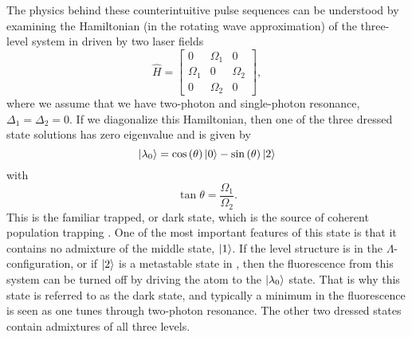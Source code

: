 The physics behind these counterintuitive pulse sequences can be understood
by examining the Hamiltonian (in the rotating wave approximation) of the
three-level system in
 driven by two laser fields
\begin{equation}
\hat{H} = \left[ 
\begin{array}{ccc}
0 & \Omega_1 & 0  \\
\Omega_1 & 0 & \Omega_2 \\
0 & \Omega_2 & 0
\end{array} \right],
\label{hamil}
\end{equation}
where we assume that we have two-photon and single-photon resonance, $\Delta_1
= \Delta_2 = 0$.  If we diagonalize this Hamiltonian, then one of the three
dressed state solutions has zero eigenvalue and is given by
\begin{equation}
\vert \lambda_0 \rangle = \cos\left(\theta\right)\vert 0 \rangle -
\sin\left(\theta\right)\vert 2 \rangle
\end{equation}
with
\begin{equation}
\tan\theta = \frac{\Omega_1}{\Omega_2}.
\end{equation}
This is the familiar trapped, or dark state, which is the
source of coherent population trapping \cite{Gray:78}.  One of the most
important features of this state is that it contains no admixture of the
middle state, $\vert 1 \rangle$.  If the level structure is in the
$\Lambda$-configuration, or if $\vert 2 \rangle$ is a metastable state in
, then the fluorescence from this system can be turned off
by driving the atom to the $\vert \lambda_0 \rangle$ state.  That is why this
state is referred to as the dark state, and typically a minimum in the
fluorescence is seen as one tunes through two-photon resonance.  The other
two dressed states contain admixtures of all three levels.

